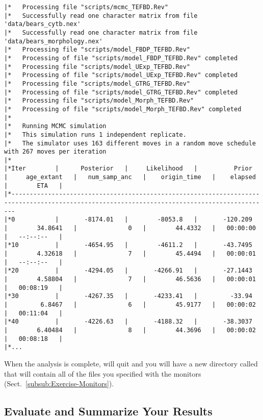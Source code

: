 {\tiny{\tt \begin{snugshade*}
\begin{lstlisting}
|*   Processing file "scripts/mcmc_TEFBD.Rev"
|*   Successfully read one character matrix from file 'data/bears_cytb.nex'
|*   Successfully read one character matrix from file 'data/bears_morphology.nex'
|*   Processing file "scripts/model_FBDP_TEFBD.Rev"
|*   Processing of file "scripts/model_FBDP_TEFBD.Rev" completed
|*   Processing file "scripts/model_UExp_TEFBD.Rev"
|*   Processing of file "scripts/model_UExp_TEFBD.Rev" completed
|*   Processing file "scripts/model_GTRG_TEFBD.Rev"
|*   Processing of file "scripts/model_GTRG_TEFBD.Rev" completed
|*   Processing file "scripts/model_Morph_TEFBD.Rev"
|*   Processing of file "scripts/model_Morph_TEFBD.Rev" completed
|*
|*   Running MCMC simulation
|*   This simulation runs 1 independent replicate.
|*   The simulator uses 163 different moves in a random move schedule with 267 moves per iteration
|*
|*Iter        |      Posterior   |     Likelihood   |          Prior   |     age_extant   |   num_samp_anc   |    origin_time   |    elapsed   |        ETA   |
|*---------------------------------------------------------------------------------------------------------------------------------------------
|*0           |       -8174.01   |        -8053.8   |       -120.209   |        34.8641   |              0   |        44.4332   |   00:00:00   |   --:--:--   |
|*10          |       -4654.95   |        -4611.2   |       -43.7495   |        4.32618   |              7   |        45.4494   |   00:00:01   |   --:--:--   |
|*20          |       -4294.05   |       -4266.91   |       -27.1443   |        4.58804   |              7   |        46.5636   |   00:00:01   |   00:08:19   |
|*30          |       -4267.35   |       -4233.41   |         -33.94   |         6.8467   |              6   |        45.9177   |   00:00:02   |   00:11:04   |
|*40          |       -4226.63   |       -4188.32   |       -38.3037   |        6.40484   |              8   |        44.3696   |   00:00:02   |   00:08:18   |
|*...
\end{lstlisting}
\end{snugshade*}}}

When the analysis is complete, \RevBayes will quit and you will have a new directory called  that will contain all of the files you specified with the monitors (Sect.\ \ref{subsub:Exercise-Monitors}).

\bigskip
\subsection{Evaluate and Summarize Your Results}\label{subsect:Exercise-SummarizeResults}

